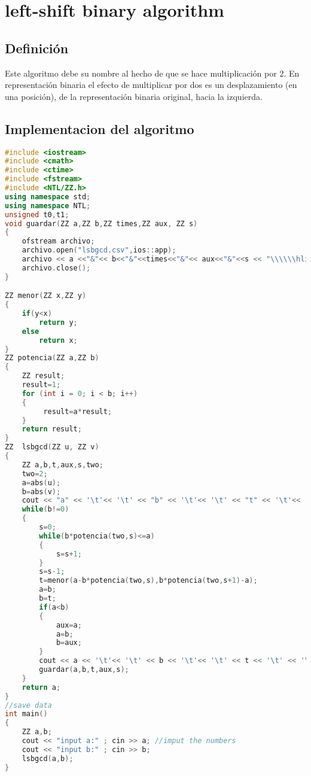 \chapter{left-shift binary algorithm}
\section{Definición}
Este algoritmo debe su nombre al hecho de que se hace multiplicación por 2. En representación
binaria el efecto de multiplicar por dos es un desplazamiento (en una posición), de la representación
binaria original, hacia la izquierda.

\section{Implementacion del algoritmo}
\begin{lstlisting}[language=C++]
#include <iostream>
#include <cmath>
#include <ctime>
#include <fstream>
#include <NTL/ZZ.h>
using namespace std;
using namespace NTL;
unsigned t0,t1;
void guardar(ZZ a,ZZ b,ZZ times,ZZ aux, ZZ s)
{
    ofstream archivo;
    archivo.open("lsbgcd.csv",ios::app);
    archivo << a <<"&"<< b<<"&"<<times<<"&"<< aux<<"&"<<s << "\\\\\\hline"<< endl;
    archivo.close();
}

ZZ menor(ZZ x,ZZ y)
{
    if(y<x)
        return y;
    else 
        return x;
}
ZZ potencia(ZZ a,ZZ b)
{
    ZZ result;
    result=1;
    for (int i = 0; i < b; i++)
    {
         result=a*result;
    }
    return result;
}
ZZ  lsbgcd(ZZ u, ZZ v)
{
    ZZ a,b,t,aux,s,two;
    two=2;
    a=abs(u);
    b=abs(v);
    cout << "a" << '\t'<< '\t' << "b" << '\t'<< '\t' << "t" << '\t'<< '\t' << "aux" << '\t'<< '\t' << "s" << endl;
    while(b!=0)
    {
        s=0;
        while(b*potencia(two,s)<=a)
        {
            s=s+1;
        }
        s=s-1;
        t=menor(a-b*potencia(two,s),b*potencia(two,s+1)-a);
        a=b;
        b=t;
        if(a<b)
        {
            aux=a;
            a=b;
            b=aux;
        }
        cout << a << '\t'<< '\t' << b << '\t'<< '\t' << t << '\t' << '\t'<< aux << '\t'<< '\t' << s <<endl; 
        guardar(a,b,t,aux,s);
    }   
    return a;
}
//save data 
int main()
{
    ZZ a,b;
    cout << "input a:" ; cin >> a; //imput the numbers 
    cout << "input b:" ; cin >> b;
    lsbgcd(a,b);   
}
\end{lstlisting}
